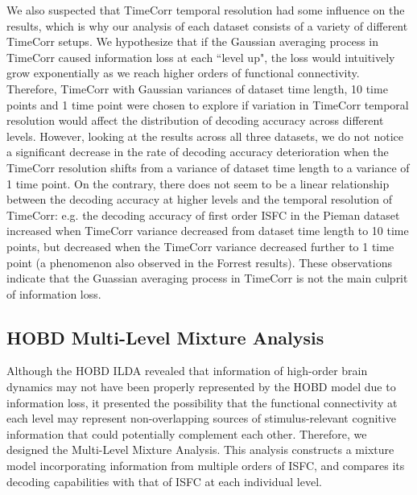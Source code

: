 \documentclass[11pt]{article}
\begin{document}
We also suspected that TimeCorr temporal resolution had some influence on the results, which is why our analysis of each dataset consists of a variety of different TimeCorr setups. We hypothesize that if the Gaussian averaging process in TimeCorr caused information loss at each ``level up", the loss would intuitively grow exponentially as we reach higher orders of functional connectivity. Therefore, TimeCorr with Gaussian variances of dataset time length, 10 time points and 1 time point were chosen to explore if variation in TimeCorr temporal resolution would affect the distribution of decoding accuracy across different levels. However, looking at the results across all three datasets, we do not notice a significant decrease in the rate of decoding accuracy deterioration when the TimeCorr resolution shifts from a variance of dataset time length to a variance of 1 time point. On the contrary, there does not seem to be a linear relationship between the decoding accuracy at higher levels and the temporal resolution of TimeCorr: e.g. the decoding accuracy of first order ISFC in the Pieman dataset increased when TimeCorr variance decreased from dataset time length to 10 time points, but decreased when the TimeCorr variance decreased further to 1 time point (a phenomenon also observed in the Forrest results). These observations indicate that the Guassian averaging process in TimeCorr is not the main culprit of information loss.

\subsection{HOBD Multi-Level Mixture Analysis}
Although the HOBD ILDA revealed that information of high-order brain dynamics may not have been properly represented by the HOBD model due to information loss, it presented the possibility that the functional connectivity at each level may represent non-overlapping sources of stimulus-relevant cognitive information that could potentially complement each other. Therefore, we designed the Multi-Level Mixture Analysis. This analysis constructs a mixture model incorporating information from multiple orders of ISFC, and compares its decoding capabilities with that of ISFC at each individual level.
\end{document}

